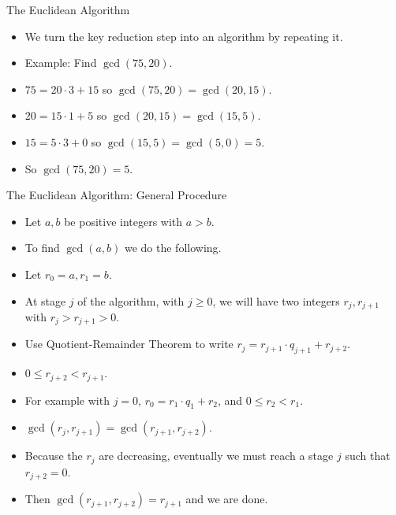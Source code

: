 \documentclass[handout]{beamer}
\begin{document}
\begin{frame}{The Euclidean Algorithm}

\begin{itemize}
  \item We turn the key reduction step into an algorithm by repeating it.
  \item Example: Find $\gcd(75, 20)$.
  \item $75 = 20\cdot 3 + 15$ so $\gcd(75, 20) = \gcd(20, 15)$.
  \item $20 = 15 \cdot 1 + 5$ so $\gcd(20, 15) = \gcd(15, 5)$.
  \item $15 = 5 \cdot 3 + 0$ so $\gcd(15, 5) = \gcd(5, 0) = 5$.
  \item So $\gcd(75, 20) = 5$.
\end{itemize}

\end{frame}

\begin{frame}{The Euclidean Algorithm: General Procedure}

\begin{itemize}
  \item Let $a,b$ be positive integers with $a>b$.
  \item To find $\gcd(a,b)$ we do the following.
  \item Let $r_0 = a, r_1 = b$.
  \item At stage $j$ of the algorithm, with $j\geq 0$, we will
  have two integers $r_j, r_{j+1}$ with $r_j > r_{j+1} > 0$.
  \item Use Quotient-Remainder Theorem to write $r_j=r_{j+1} \cdot q_{j+1} + r_{j+2}$.
  \item $0\leq r_{j+2} < r_{j+1}$.
  \item For example with $j=0$, $r_0 = r_{1} \cdot q_{1} + r_2$, and $0\leq r_2 < r_1$.
  \item $\gcd(r_j, r_{j+1}) = \gcd(r_{j+1}, r_{j+2})$.
  \item Because the $r_j$ are decreasing, eventually we must reach a stage $j$ such that $r_{j+2} = 0$.
  \item Then $\gcd(r_{j+1}, r_{j+2}) = r_{j+1}$ and we are done.
\end{itemize}

\end{frame}
\end{document}

